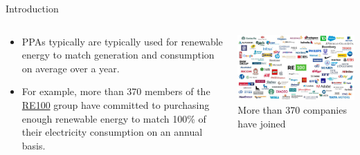 \begin{frame}{Introduction}

  \begin{columns}[T]
    \begin{column}{6cm}
      \begin{itemize}
        \item   PPAs typically are typically used for renewable energy to match generation 
        and consumption on average over a year.
        \item For example, more than 370 members of the \href{https://www.there100.org/}{RE100} group have committed to purchasing enough renewable energy to match
        \alert{100\% of their electricity consumption on an annual basis}.
      \end{itemize}
    \end{column}

  \begin{column}{10cm}
      \centering
      
      \includegraphics[width=10cm]{images/100re-companies.jpg}
      \vspace{.1cm}
      {\footnotesize
      More than 370 companies have joined 
      }
    \end{column}
    \end{columns}

\end{frame}
  



